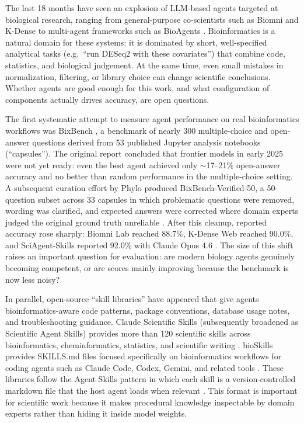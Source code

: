 \documentclass[11pt]{article}
\begin{document}
The last 18 months have seen an explosion of LLM-based agents targeted at
biological research, ranging from general-purpose co-scientists such as
Biomni \citep{huang2025biomni} and K-Dense \citep{li2025kdense} to
multi-agent frameworks such as BioAgents \citep{mehandru2025bioagents}.
Bioinformatics is a natural domain for these systems: it is dominated by
short, well-specified analytical tasks (e.g.\ ``run DESeq2 with these
covariates'') that combine code, statistics, and biological judgement. At
the same time, even small mistakes in normalization, filtering, or library
choice can change scientific conclusions. Whether agents are good enough
for this work, and what configuration of components actually drives
accuracy, are open questions.

The first systematic attempt to measure agent performance on real
bioinformatics workflows was BixBench \citep{mitchener2025bixbench}, a
benchmark of nearly 300 multiple-choice and open-answer questions derived
from 53 published Jupyter analysis notebooks (``capsules''). The original
report concluded that frontier models in early 2025 were not yet ready:
even the best agent achieved only $\sim$17--21\% open-answer accuracy and
no better than random performance in the multiple-choice setting. A
subsequent curation effort by Phylo produced BixBench-Verified-50, a
50-question subset across 33 capsules in which problematic questions were
removed, wording was clarified, and expected answers were corrected where
domain experts judged the original ground truth unreliable
\citep{phylo2026,hfbixverified}. After this cleanup, reported accuracy
rose sharply: Biomni Lab reached 88.7\%, K-Dense Web reached 90.0\%, and
SciAgent-Skills reported 92.0\% with Claude Opus 4.6
\citep{phylo2026,kdense2026,sciagent2026}. The size of this shift raises
an important question for evaluation: are modern biology agents genuinely
becoming competent, or are scores mainly improving because the benchmark
is now less noisy?

In parallel, open-source ``skill libraries'' have appeared that give
agents bioinformatics-aware code patterns, package conventions, database
usage notes, and troubleshooting guidance. Claude Scientific Skills
(subsequently broadened as Scientific Agent Skills) provides more than 120
scientific skills across bioinformatics, cheminformatics, statistics, and
scientific writing \citep{kdenseskills,kdensescientificagentskills}.
bioSkills provides SKILLS.md files focused specifically on bioinformatics
workflows for coding agents such as Claude Code, Codex, Gemini, and related
tools \citep{bioskills}. These libraries follow the Agent Skills pattern in
which each skill is a version-controlled markdown file that the host agent
loads when relevant \citep{anthropicskills}. This format is important for
scientific work because it makes procedural knowledge inspectable by domain
experts rather than hiding it inside model weights.
\end{document}
